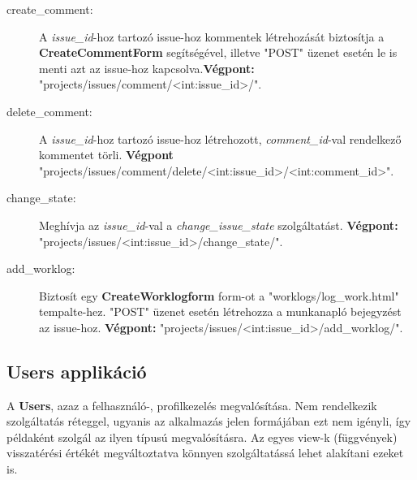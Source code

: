 \begin{itemize}
\begin{description}
		\item[create\_comment:] A \textit{issue\_id}-hoz tartozó issue-hoz kommentek létrehozását biztosítja a \textbf{CreateCommentForm} segítségével, illetve "POST" üzenet esetén le is menti azt az issue-hoz kapcsolva.\textbf{Végpont:} "projects/issues/comment/<int:issue\_id>/".
		\item[delete\_comment:] A \textit{issue\_id}-hoz tartozó issue-hoz létrehozott, \textit{comment\_id}-val rendelkező kommentet törli. \textbf{Végpont} "projects/issues/comment/delete/<int:issue\_id>/<int:comment\_id>".
		\item[change\_state:] Meghívja az \textit{issue\_id}-val a \textit{change\_issue\_state} szolgáltatást. \textbf{Végpont:} "projects/issues/<int:issue\_id>/change\_state/".
		\item[add\_worklog:] Biztosít egy \textbf{CreateWorklogform} form-ot a "worklogs/log\_work.html" tempalte-hez. "POST" üzenet esetén létrehozza a munkanapló bejegyzést az issue-hoz. \textbf{Végpont:} "projects/issues/<int:issue\_id>/add\_worklog/".
	\end{description}
\end{itemize}	

\subsection{Users applikáció}

A \textbf{Users}, azaz a felhasználó-, profilkezelés megvalósítása. Nem rendelkezik szolgáltatás réteggel, ugyanis az alkalmazás jelen formájában ezt nem igényli, így példaként szolgál az ilyen típusú megvalósításra. Az egyes view-k (függvények) visszatérési értékét megváltoztatva könnyen szolgáltatássá lehet alakítani ezeket is.

